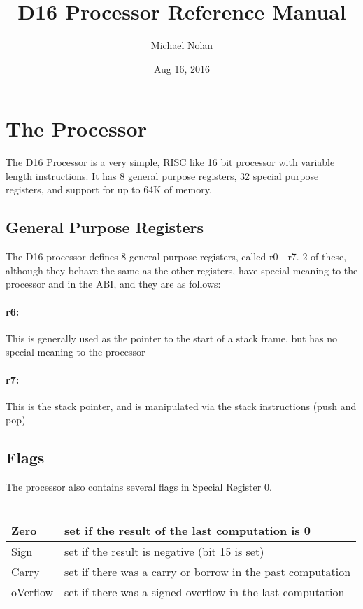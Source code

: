 \documentclass{article}
\title{D16 Processor Reference Manual}
\date{Aug 16, 2016}
\author{Michael Nolan}
\begin{document}
	\maketitle
	\newpage
	\tableofcontents
	\newpage
	
	\section{The Processor}
	The D16 Processor is a very simple, RISC like 16 bit processor with variable length instructions. It has 8 general purpose registers, 32 special purpose registers, and support for up to 64K of memory.
	\subsection{General Purpose Registers}
	The D16 processor defines 8 general purpose registers, called r0 - r7. 2 of these, although they behave the same as the other registers, have special meaning to the processor and in the ABI, and they are as follows: \newline
		\paragraph{r6:} This is generally used as the pointer to the start of a stack frame, but has no special meaning to the processor
		\paragraph{r7:} This is the stack pointer, and is manipulated via the stack instructions (push and pop)
	\subsection{Flags}
		The processor also contains several flags in Special Register 0. \\ \\
		\begin{tabular}{| l | l |}
		\hline
			Zero & set if the result of the last computation is 0 \\ \hline
			Sign & set if the result is negative (bit 15 is set) \\ \hline
			Carry & set if there was a carry or borrow in the past computation \\ \hline
			oVerflow & set if there was a signed overflow in the last computation \\ \hline
		\end{tabular}
\end{document}
